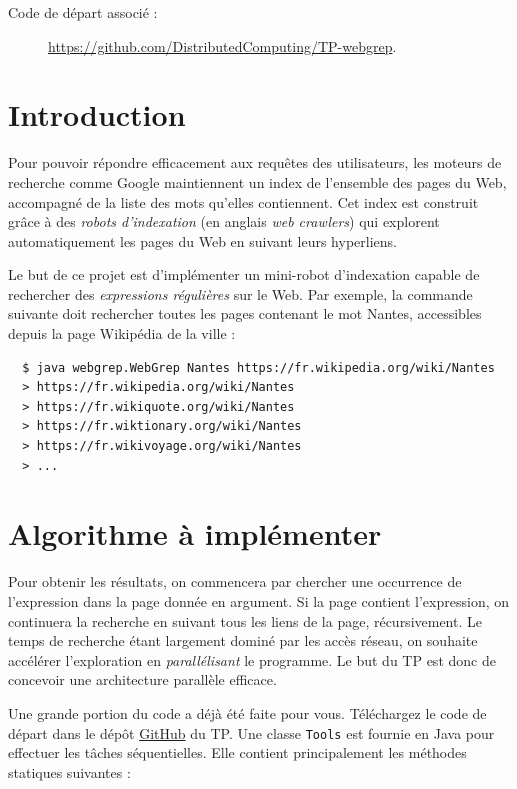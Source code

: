 
\begingroup

\begin{description}
\item[Code de départ associé :] \url{https://github.com/DistributedComputing/TP-webgrep}.
\end{description}

\section{Introduction}

Pour pouvoir répondre efficacement aux requêtes des utilisateurs,
les moteurs de recherche comme Google maintiennent un index de l'ensemble des pages du Web,
accompagné de la liste des mots qu'elles contiennent.
Cet index est construit grâce à des \emph{robots d'indexation}
(en anglais \emph{web crawlers})
qui explorent automatiquement les pages du Web en suivant leurs hyperliens.

Le but de ce projet est d'implémenter un mini-robot d'indexation
capable de rechercher des \emph{expressions régulières} sur le Web.
Par exemple, la commande suivante doit rechercher toutes les pages contenant le mot \og{}Nantes\fg{},
accessibles depuis la page Wikipédia de la ville :

\begin{lstlisting}
  $ java webgrep.WebGrep Nantes https://fr.wikipedia.org/wiki/Nantes
  > https://fr.wikipedia.org/wiki/Nantes
  > https://fr.wikiquote.org/wiki/Nantes
  > https://fr.wiktionary.org/wiki/Nantes
  > https://fr.wikivoyage.org/wiki/Nantes
  > ...
\end{lstlisting}

\section{Algorithme à implémenter}

Pour obtenir les résultats, on commencera par chercher une occurrence de l'expression dans la page donnée en argument.
Si la page contient l'expression, on continuera la recherche en suivant tous les liens de la page, récursivement.
Le temps de recherche étant largement dominé par les accès réseau, on souhaite accélérer l'exploration
en \emph{parallélisant} le programme.  
Le but du TP est donc de concevoir une architecture parallèle efficace.

Une grande portion du code a déjà été faite pour vous.
Téléchargez le code de départ dans le dépôt \href{https://github.com/DistributedComputing/TP-webgrep}{GitHub} du TP.
Une classe \lstinline{Tools} est fournie en Java pour effectuer les tâches séquentielles.
Elle contient principalement les méthodes statiques suivantes :

